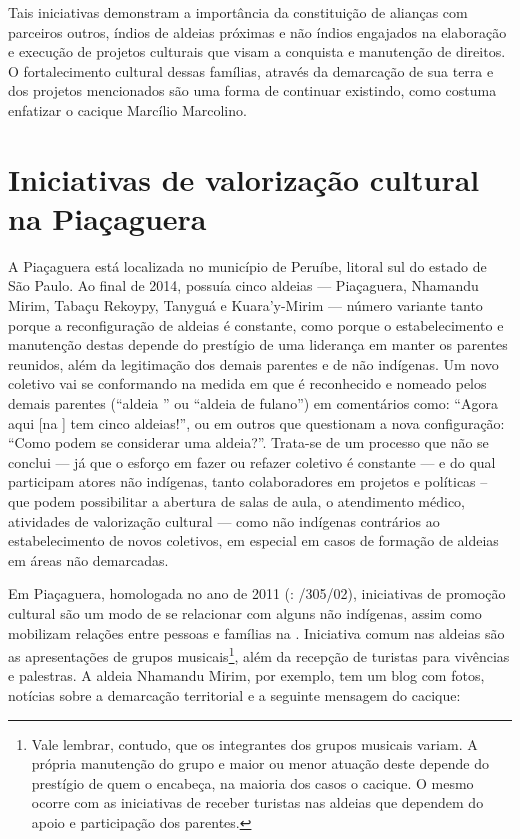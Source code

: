 Tais iniciativas demonstram a importância da constituição de alianças
com parceiros outros, índios de aldeias próximas e não índios engajados
na elaboração e execução de projetos culturais que visam a conquista e
manutenção de direitos. O fortalecimento cultural dessas famílias,
através da demarcação de sua terra e dos projetos mencionados são uma
forma de continuar existindo, como costuma enfatizar o cacique Marcílio
Marcolino.  

\section{Iniciativas de valorização cultural na  Piaçaguera}

A  Piaçaguera está localizada no município de Peruíbe, litoral sul do
estado de São Paulo. Ao final de 2014, possuía cinco aldeias ---
Piaçaguera, Nhamandu Mirim, Tabaçu Rekoypy, Tanyguá e Kuara’y-Mirim ---
número variante tanto porque a reconfiguração de aldeias é constante,
como porque o estabelecimento e manutenção destas depende do prestígio
de uma liderança em manter os parentes reunidos, além da legitimação
dos demais parentes e de não indígenas. Um novo coletivo vai se
conformando na medida em que é reconhecido e nomeado pelos demais
parentes (``aldeia '' ou ``aldeia de fulano'') em comentários como: ``Agora
aqui [na ] tem cinco aldeias!'', ou em outros que questionam a nova
configuração: ``Como podem se considerar uma aldeia?''. Trata-se de um
processo que não se conclui --- já que o esforço em fazer ou refazer
coletivo é constante --- e do qual participam atores não indígenas, tanto
colaboradores em projetos e políticas – que podem possibilitar a
abertura de salas de aula, o atendimento médico, atividades de
valorização cultural --- como não indígenas contrários ao estabelecimento
de novos coletivos, em especial em casos de formação de aldeias em
áreas não demarcadas. 

Em Piaçaguera,  homologada no ano de 2011 (: /305/02),
iniciativas de promoção cultural são um modo de se relacionar com
alguns não indígenas, assim como mobilizam relações entre pessoas e
famílias na . Iniciativa comum nas aldeias são as apresentações de
grupos musicais\footnote{Vale lembrar, contudo, que os integrantes dos
grupos musicais variam. A própria manutenção do grupo e maior ou menor
atuação deste depende do prestígio de quem o encabeça, na maioria dos
casos o cacique. O mesmo ocorre com as iniciativas de receber turistas
nas aldeias que dependem do apoio e participação dos parentes.}, além
da recepção de turistas para vivências e palestras. A aldeia Nhamandu
Mirim, por exemplo, tem um blog com fotos, notícias sobre a demarcação
territorial e a seguinte mensagem do cacique:

